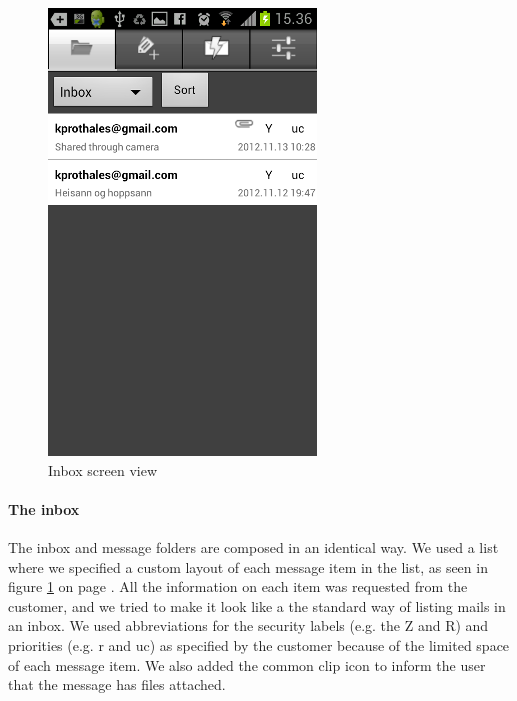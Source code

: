 \begin{figure}[H]
\begin{center}
\includegraphics{inbox_final}
\end{center}
\caption{Inbox screen view} \label{fig:frontend_inbox}
\end{figure}

\paragraph{The inbox}\hfill
\newline
The inbox and message folders are composed in an identical way. We used a list where we specified a custom layout of each message item in the list, as seen in figure \ref{fig:frontend_inbox} on page \pageref{fig:frontend_inbox}. All the information on each item was requested from the customer, and we tried to make it look like a the standard way of listing mails 
in an inbox. We used abbreviations for the security labels (e.g. the Z and R) and priorities (e.g. r and uc) as specified by the customer because of the limited space of each message item. We also added the common clip icon to inform the user that the message has files attached. 

\newpage

